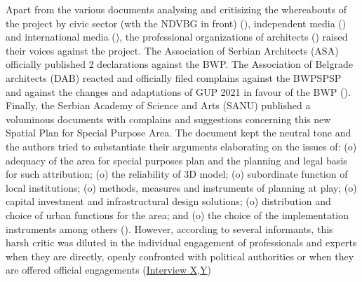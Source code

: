 \documentclass[11pt]{report}
\begin{document}
Apart from the various documents analysing and critisizing the whereabouts of the project by civic sector (wth the NDVBG in front) (\cite{ref doks}), independent media (\cite{imena and ref}) and international media (\cite{ref Gardian}), the professional organizations of architects (\cite{ref}) raised their voices against the project.
The Association of Serbian Architects (ASA) officially published 2 declarations against the BWP. 
The Association of Belgrade architects (DAB) reacted and officially filed complains against the BWPSPSP and against the changes and adaptations of GUP 2021 in favour of the BWP (\cite{ref}).
\\

Finally, the Serbian Academy of Science and Arts (SANU) published a voluminous documents with complains and suggestions concerning this new Spatial Plan for Special Purpose Area.
The document kept the neutral tone and the authors tried to substantiate their arguments elaborating on the issues of:
(o) adequacy of the area for special purposes plan and the planning and legal basis for such attribution;
(o) the reliability of 3D model;
(o) subordinate function of local institutions;
(o) methods, measures and instruments of planning at play;
(o) capital investment and infrastructural design solutions;
(o) distribution and choice of urban functions for the area;
and
(o) the choice of the implementation instruments among others (\href{ref}{\citealt{sanu_nacrt_2014}}).
However, according to several informants, this harsh critic was diluted in the individual engagement of professionals and experts when they are directly, openly confronted with political authorities or when they are offered official engagements
(\href{InterviewX}{Interview X,Y})
\\
\end{document}
